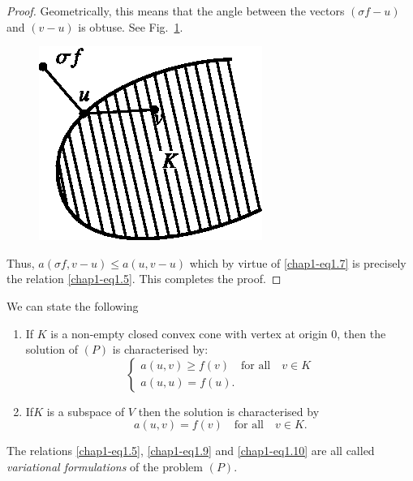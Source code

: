 \begin{proof}
Geometrically, this means that the angle between the vectors $(\sigma
f-u)$ and $(v-u)$ is obtuse. See Fig.~\ref{chap1-fig1.1}.
\begin{figure}[H]
\centering
\includegraphics[scale=1.1]{figure/fig1.1.eps}
\caption{}\label{chap1-fig1.1}
\end{figure}

Thus, $a(\sigma f,v-u)\leq a(u,v-u)$ which by virtue of
\eqref{chap1-eq1.7} is precisely the relation
\eqref{chap1-eq1.5}. This completes the proof.
\end{proof}

We can state the following
\begin{corollary}\label{chap1-coro1.1}
\begin{enumerate}
\renewcommand{\theenumi}{\alph{enumi}}
\renewcommand{\labelenumi}{\rm(\theenumi)}
\item If $K$ is a non-empty closed convex cone with vertex at origin
  $0$, then the solution of $(P)$ is characterised by:
\begin{equation*}
\begin{cases}
a(u,v)\geq f(v)\quad\text{for all}\quad v\in K\\
a(u,u)=f(u).
\end{cases}\tag{1.9}\label{chap1-eq1.9}
\end{equation*}

\item If\pageoriginale $K$ is a subspace of $V$ then the solution is
  characterised by
\begin{equation*}
a(u,v)=f(v)\quad\text{for all}\quad v\in K.\tag{1.10}\label{chap1-eq1.10}
\end{equation*}
\end{enumerate}
\end{corollary}

\begin{remark}\label{chap1-rem1.2}
The relations \eqref{chap1-eq1.5}, \eqref{chap1-eq1.9} and
\eqref{chap1-eq1.10} are all called {\em variational formulations} of
the problem $(P)$.
\end{remark}

